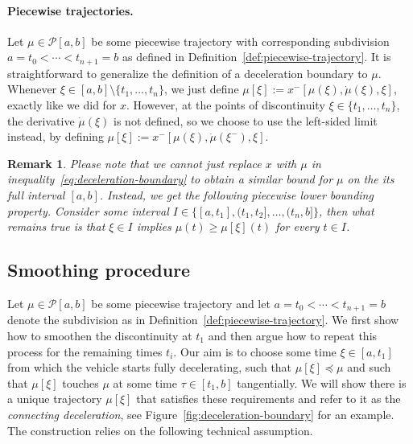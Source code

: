 \documentclass[a4paper]{report}
\theoremstyle{definition}
\theoremstyle{plain}
\newtheorem{remark}{Remark}[chapter]
\newcommand\openhalf[2]{\ensuremath{(#1,#2]}}
\begin{document}
\paragraph{Piecewise trajectories.}
Let $\mu \in \mathcal{P}[a, b]$ be some piecewise trajectory with corresponding
subdivision $a = t_{0} < \cdots < t_{n+1} = b$ as defined in Definition~\ref{def:piecewise-trajectory}. It is
straightforward to generalize the definition of a deceleration boundary to $\mu$.
%
Whenever $\xi \in [a,b] \setminus \{ t_{1}, \dots, t_{n}\}$, we just define
$\mu[\xi] := x^{-}[\mu(\xi), \dot{\mu}(\xi), \xi]$, exactly like we did for $x$.
%
However, at the points of discontinuity $\xi \in \{ t_{1}, \dots, t_{n}\}$, the
derivative $\dot{\mu}(\xi)$ is not defined, so we choose to use the left-sided limit
instead, by defining $\mu[\xi] := x^{-}[\mu(\xi), \dot{\mu}(\xi^{-}), \xi]$.

\begin{remark}\label{rem:lower-bound-piecewise}
  Please note that we cannot just replace $x$ with $\mu$ in inequality~\eqref{eq:deceleration-boundary} to
  obtain a similar bound for $\mu$ on the its full interval $[a,b]$.
  Instead, we get the following \emph{piecewise lower bounding} property.
  Consider some interval
  $I \in \{ [a, t_{1}], \openhalf{t_{1}}{t_{2}}, \dots, \openhalf{t_{n}}{b} \}$, then what
  remains true is that $\xi \in I$ implies $\mu(t) \geq \mu[\xi](t)$ for every $t \in I$.
\end{remark}


\subsection{Smoothing procedure}\label{sec:smoothing}
Let $\mu \in \mathcal{P}[a,b]$ be some piecewise trajectory and let
$a = t_{0} < \cdots < t_{n+1} = b$ denote the subdivision as in Definition~\ref{def:piecewise-trajectory}.
%
We first show how to smoothen the discontinuity at $t_{1}$ and then argue how to
repeat this process for the remaining times $t_{i}$.
Our aim is to choose some time $\xi \in [a,t_{1}]$ from which the vehicle starts
fully decelerating, such that $\mu[\xi] \preceq \mu$ and such that $\mu[\xi]$ touches $\mu$ at some time
$\tau \in [t_{1}, b]$ tangentially.
%
We will show there is a unique trajectory $\mu[\xi]$ that satisfies these requirements
and refer to it as the \emph{connecting deceleration}, see
Figure~\ref{fig:deceleration-boundary} for an example.
%
The construction relies on the following technical assumption.
\end{document}
